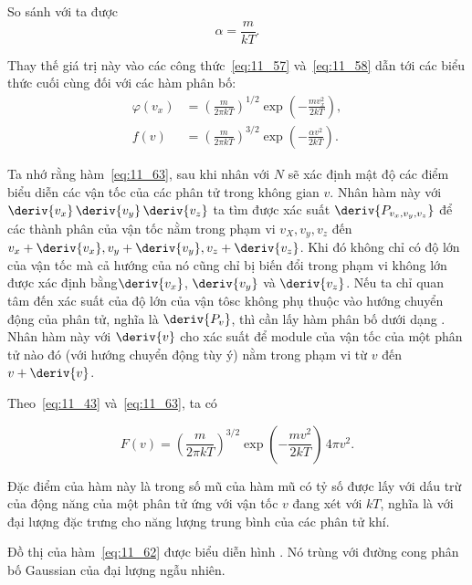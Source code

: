\noindent
So sánh với  ta được
\begin{equation}\label{eq:11_61}
	\alpha = \frac{m}{kT}.
\end{equation}

\noindent
Thay thế giá trị này vào các công thức~\eqref{eq:11_57} và~\eqref{eq:11_58} dẫn tới các biểu thức cuối cùng đối với các hàm phân bố:
\begin{align}
	\varphi(v_x) &= \left(\frac{m}{2\pi kT}\right)^{1/2} \exp\left(-\frac{m v_x^2}{2kT}\right), \label{eq:11_62}\\
	f(v) &= \left(\frac{m}{2\pi kT}\right)^{3/2} \exp\left(-\frac{\alpha v^2}{2kT}\right).\label{eq:11_63}
\end{align}

Ta nhớ rằng hàm~\eqref{eq:11_63}, sau khi nhân với $N$ sẽ xác định mật độ các điểm biểu diễn các vận tốc của các phân tử trong không gian $v$. Nhân hàm này với $\deriv{v_x}\,\deriv{v_y}\,\deriv{v_z}$ ta tìm được xác suất $\deriv{P_{v_x,v_y,v_z}}$ để các thành phân của vận tốc nằm trong phạm vi $v_X, v_y, v_z$ đến $v_x+\deriv{v_x}, v_y+\deriv{v_y}, v_z+\deriv{v_z}$. Khi đó không chỉ có độ lớn của vận tốc mà cả hướng của nó cũng chỉ bị biến đổi trong phạm vi không lớn được xác định bằng$\deriv{v_x}$, $\deriv{v_y}$ và $\deriv{v_z}$. Nếu ta chỉ quan tâm đến xác suất của độ lớn của vận tôsc không phụ thuộc vào hướng chuyển động của phân tử, nghĩa là $\deriv{P_v}$, thì cần lấy hàm phân bố dưới dạng . Nhân hàm này với $\deriv{v}$ cho xác suất để module của vận tốc của một phân tử nào đó (với hướng chuyển động tùy ý) nằm trong phạm vi từ $v$ đến $v+\deriv{v}$.

Theo~\eqref{eq:11_43} và~\eqref{eq:11_63}, ta có

\begin{equation}\label{eq:11_64}
	F(v) = \left(\frac{m}{2\pi kT}\right)^{3/2} \exp\left(-\frac{mv^2}{2kT}\right)\,4\pi v^2.
\end{equation}

\noindent
Đặc điểm của hàm này là trong số mũ của hàm mũ có tỷ số được lấy với dấu trừ của động năng của một phân tử ứng với vận tốc $v$ đang xét với $kT$, nghĩa là với đại lượng đặc trưng cho năng lượng trung bình của các phân tử khí.

Đồ thị của hàm~\eqref{eq:11_62} được biểu diễn  hình . Nó trùng với đường cong phân bố Gaussian của đại lượng ngẫu nhiên.

